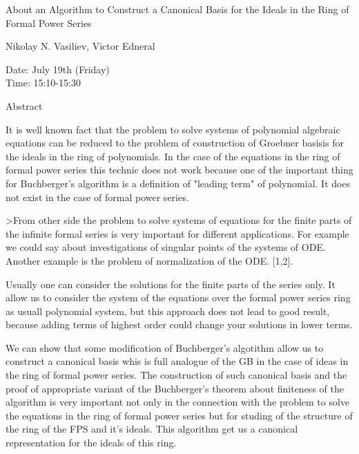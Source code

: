 \begin{center}
\LARGE
About an Algorithm to Construct a Canonical Basis for the
           Ideals in the Ring of Formal Power Series

\end{center}

\begin{center}
\Large
Nikolay N. Vasiliev, Victor Edneral

\end{center}

\noindent
Date:  July 19th (Friday)\\
Time:  15:10-15:30 \\

\begin{center}
\large
Abstract
\end{center}

It is well known fact that the problem to solve systems of polynomial algebraic equations can be
reduced to the problem of construction of Groebner basisis for the ideals in the ring of
polynomials. In the case of the equations in the ring of formal power series this technic does not
work because one of the important thing for Buchberger's algorithm is a definition of "leading
term" of polynomial. It does not exist in the case of formal power series. 

>From other side the problem to solve systems of equations for the finite parts of the infinite
formal series is very important for different applications. For example we could say about
investigations of singular points of the systems of ODE. Another example is the problem of
normalization of the ODE. [1,2]. 

Usually one can consider the solutions for the finite parts of the series only. It allow us to consider
the system of the equations over the formal power series ring as usuall polynomial system, but this
approach does not lead to good result, because adding terms of highest order could change your
solutions in lower terms. 

We can show that some modification of Buchberger's algotithm allow us to construct a canonical
basis whis is full analogue of the GB in the case of ideas in the ring of formal power series. The
construction of such canonical basis and the proof of appropriate variant of the Buchberger's
theorem about finiteness of the algorithm is very important not only in the connection with the
problem to solve the equations in the ring of formal power series but for studing of the structure of
the ring of the FPS and it's ideals. This algorithm get us a canonical representation for the ideals of
this ring. 

